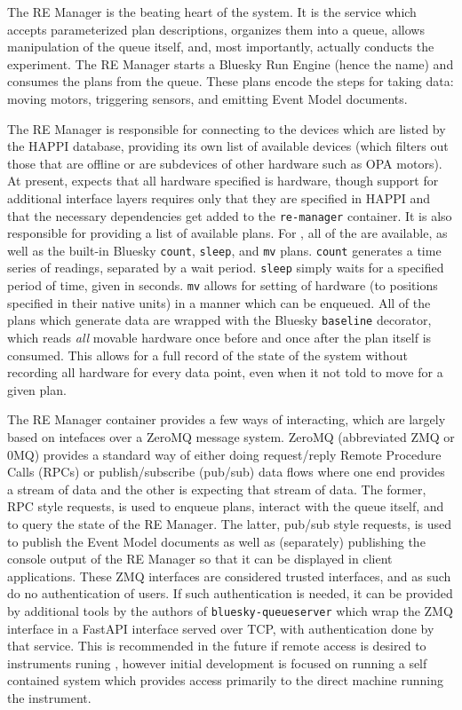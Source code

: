The RE Manager is the beating heart of the \biab system.
It is the service which accepts parameterized plan descriptions, organizes them into a queue, allows manipulation of the queue itself, and, most importantly, actually conducts the experiment.
The RE Manager starts a Bluesky Run Engine (hence the name) and consumes the plans from the queue.
These plans encode the steps for taking data: moving motors, triggering sensors, and emitting Event Model documents.

The RE Manager is responsible for connecting to the devices which are listed by the HAPPI database, providing its own list of available devices (which filters out those that are offline or are subdevices of other hardware such as OPA motors).
At present, \biab expects that all hardware specified is \yaq{} hardware, though support for additional interface layers requires only that they are specified in HAPPI and that the necessary dependencies get added to the \texttt{re-manager} container.
It is also responsible for providing a list of available plans.
For \biab, all of the \wrightplans are available, as well as the built-in Bluesky \texttt{count}, \texttt{sleep}, and \texttt{mv} plans.
\texttt{count} generates a time series of readings, separated by a wait period.
\texttt{sleep} simply waits for a specified period of time, given in seconds.
\texttt{mv} allows for setting of hardware (to positions specified in their native units) in a manner which can be enqueued.
All of the plans which generate data are wrapped with the Bluesky \texttt{baseline} decorator, which reads \textit{all} movable hardware once before and once after the plan itself is consumed.
This allows for a full record of the state of the system without recording all hardware for every data point, even when it not told to move for a given plan.

The RE Manager container provides a few ways of interacting, which are largely based on intefaces over a ZeroMQ\cite{Hintjens_2013} message system.
ZeroMQ (abbreviated ZMQ or 0MQ) provides a standard way of either doing request/reply Remote Procedure Calls (RPCs) or publish/subscribe (pub/sub) data flows where one end provides a stream of data and the other is expecting that stream of data.
The former, RPC style requests, is used to enqueue plans, interact with the queue itself, and to query the state of the RE Manager.
The latter, pub/sub style requests, is used to publish the Event Model documents as well as (separately) publishing the console output of the RE Manager so that it can be displayed in client applications.
These ZMQ interfaces are considered trusted interfaces, and as such do no authentication of users.
If such authentication is needed, it can be provided by additional tools by the authors of \texttt{bluesky-queueserver} which wrap the ZMQ interface in a FastAPI\cite{fastapi} interface served over TCP, with authentication done by that service.
This is recommended in the future if remote access is desired to instruments runing \biab, however initial development is focused on running a self contained system which provides access primarily to the direct machine running the instrument.


